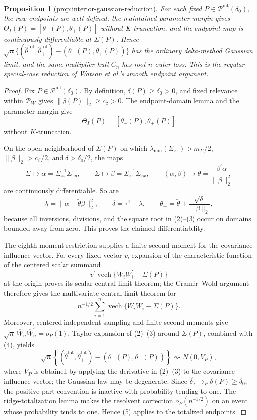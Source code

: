 \documentclass{article}
\newtheorem{proposition}{Proposition}
\begin{document}
\begin{proposition}[prop:interior-gaussian-reduction]\label{prop:interior-gaussian-reduction}
For each fixed \(P\in\mathcal P^{\mathrm{int}}(\delta_0)\), the raw endpoints are well defined, the maintained parameter margin gives \(\Theta_I(P)=[\theta_-(P),\theta_+(P)]\) without \(K\)-truncation, and the endpoint map is continuously differentiable at \(\Sigma(P)\). Hence \(\sqrt n\{(\widehat\theta_-^{\mathrm{tot}},\widehat\theta_+^{\mathrm{tot}})-(\theta_-(P),\theta_+(P))\}\) has the ordinary delta-method Gaussian limit, and the same multiplier hull \(C_n\) has root-\(n\) outer loss. This is the regular special-case reduction of Watson et al.'s smooth endpoint argument.
\end{proposition}
\begin{proof}
Fix \(P\in\mathcal P^{\mathrm{int}}(\delta_0)\). By definition, \(\delta(P)\geq\delta_0>0\), and fixed relevance within \(\mathcal P_W\) gives \(\|\beta(P)\|_2\geq c_\beta>0\). The endpoint-domain lemma and the parameter margin give
\[
 \Theta_I(P)=[\theta_-(P),\theta_+(P)] \tag{1}
\]
without \(K\)-truncation.

On the open neighborhood of \(\Sigma(P)\) on which \(\lambda_{\min}(\Sigma_{zz})>m_\Sigma/2\), \(\|\beta\|_2>c_\beta/2\), and \(\delta>\delta_0/2\), the maps
\[
 \Sigma\longmapsto\alpha=\Sigma_{zz}^{-1}\Sigma_{zy},
 \qquad
 \Sigma\longmapsto\beta=\Sigma_{zz}^{-1}\Sigma_{zx},
 \qquad
 (\alpha,\beta)\longmapsto\check\theta
 =\frac{\beta^{\prime}\alpha}{\|\beta\|_2^2} \tag{2}
\]
are continuously differentiable. So are
\[
 \lambda=\|\alpha-\check\theta\beta\|_2^2,
 \qquad
 \delta=\tau^2-\lambda,
 \qquad
 \theta_\pm=\check\theta\pm\frac{\sqrt\delta}{\|\beta\|_2}, \tag{3}
\]
because all inversions, divisions, and the square root in (2)--(3) occur on domains bounded away from zero. This proves the claimed differentiability.

The eighth-moment restriction supplies a finite second moment for the covariance influence vector. For every fixed vector \(v\), expansion of the characteristic function of the centered scalar summand
\[
 v^{\prime}\operatorname{vech}\{W_iW_i^{\prime}-\Sigma(P)\}
\]
at the origin proves its scalar central limit theorem; the Cram\'{e}r--Wold argument therefore gives the multivariate central limit theorem for
\[
 n^{-1/2}\sum_{i=1}^n
 \operatorname{vech}\{W_iW_i^{\prime}-\Sigma(P)\}. \tag{4}
\]
Moreover, centered independent sampling and finite second moments give \(\sqrt n\,\overline W_n\overline W_n^{\prime}=o_P(1)\). Taylor expansion of (2)--(3) around \(\Sigma(P)\), combined with (4), yields
\[
 \sqrt n\left\{
 (\widehat\theta_-^{\mathrm{tot}},\widehat\theta_+^{\mathrm{tot}})
 -(\theta_-(P),\theta_+(P))\right\}
 \rightsquigarrow N(0,V_P), \tag{5}
\]
where \(V_P\) is obtained by applying the derivative in (2)--(3) to the covariance influence vector; the Gaussian law may be degenerate. Since \(\widehat\delta_n\to_P\delta(P)\geq\delta_0\), the positive-part convention is inactive with probability tending to one. The ridge-totalization lemma makes the resolvent correction \(o_P(n^{-1/2})\) on an event whose probability tends to one. Hence (5) applies to the totalized endpoints.


\end{proof}
\end{document}
